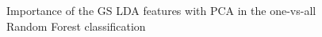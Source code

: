 \documentclass[twoside]{article}
\begin{document}
\begin{multicols}{2}
\begin{figure}[H]
\centering
{}
\quad
{}
\quad
{}
%
\caption{Importance of the GS LDA features with PCA in the one-vs-all Random Forest classification}
\label{fig:figure}
\end{figure}


\end{multicols}
\end{document}
